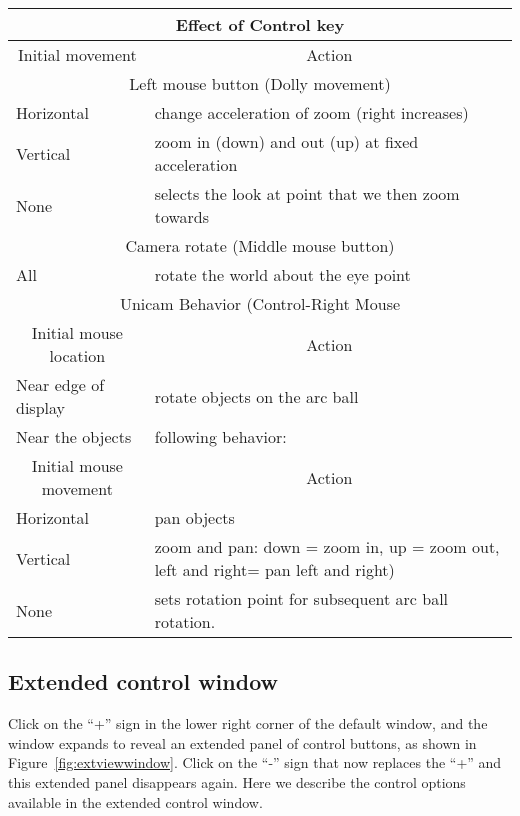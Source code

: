 \begin{center}
\begin{tabular}{|l|p{3in}} \hline
    \multicolumn{2}{|c|}{Effect of Control key} \\ \hline
    \multicolumn{1}{|c|}{Initial movement} & 
    \multicolumn{1}{|c|}{Action}\\ 
    \hline
    \multicolumn{2}{|c|}{Left mouse button (Dolly movement)}\\
    Horizontal & change acceleration of zoom (right increases) \\
    Vertical & zoom in (down) and out (up) at fixed acceleration \\
    None & selects the look at point that we then zoom towards \\
    \hline
    \multicolumn{2}{|c|}{Camera rotate (Middle mouse button)} \\
    All  & rotate the world about the eye point \\
    \hline
    \multicolumn{2}{|c|}{Unicam Behavior (Control-Right Mouse}\\
    \multicolumn{1}{|c|}{Initial mouse location} & 
    \multicolumn{1}{|c|}{Action}\\ 
    \hline
    Near edge of display & rotate objects on the arc ball \\
    Near the objects & following behavior: \\
    \hline
    \multicolumn{1}{|c|}{Initial mouse movement} & 
    \multicolumn{1}{|c|}{Action}\\ 
    Horizontal & pan objects \\ 
    Vertical & zoom and pan: down = zoom in, up = zoom
    out, left and right= pan left and right) \\
    None & sets rotation point for subsequent arc ball rotation.\\

\end{tabular}
\end{center}


\subsection{Extended control window}
\label{sec:view-control} 

Click on the ``+'' sign in the lower right corner of the default
\viewer{} window, and the window expands to reveal an extended panel of
control buttons, as shown in Figure~\ref{fig:extviewwindow}.  Click on the
``-'' sign that now replaces the ``+'' and this extended panel disappears
again.  Here we describe the control options available in the extended
control window.

